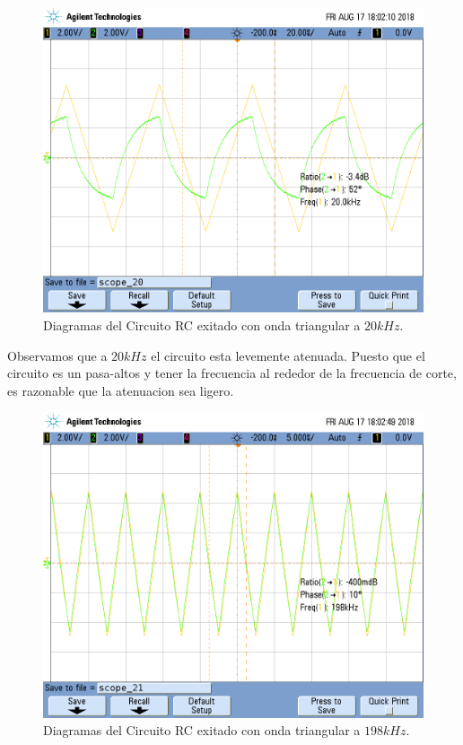 \begin{figure}[h!]
\centering
\includegraphics[scale=0.3]{2_20k.png}
\caption{Diagramas del Circuito RC exitado con onda triangular a $20kHz$.}
\label{fig:CR}
\end{figure}

Observamos que a $20kHz$ el circuito esta levemente atenuada. Puesto que el circuito es un pasa-altos y tener la frecuencia al rededor de la frecuencia de corte, es razonable que la atenuacion sea ligero.

\begin{figure}[h!]
\centering
\includegraphics[scale=0.3]{2_198k.png}
\caption{Diagramas del Circuito RC exitado con onda triangular a $198kHz$.}
\label{fig:CR}
\end{figure}

